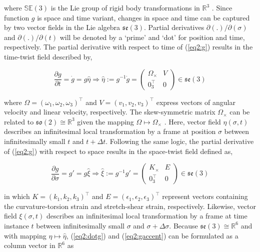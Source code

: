 where $\mathbb{SE}(3)$ is the Lie group of rigid body transformations in $\mathbb{R}^3$ \cite{Sola2018}. Since function $g$ is space and time variant, changes in space and time can be captured by two vector fields in the Lie algebra $\mathfrak{se}(3)$. Partial derivatives $\partial (.)/\partial(\sigma)$ and $\partial (.)/\partial(t)$ will be denoted by a `prime' and `dot' for position and time, respectively. The partial derivative with respect to time of (\ref{eq2:g}) results in the time-twist field described by,


\begin{equation}
    \frac{\partial g}{\partial t} = \dot{g} = g\hat{\eta} \Longrightarrow \hat{\eta} := g^{-1}\dot{g} = \begin{pmatrix} \Omega_\times & V \\ 0_3^\top & 0 \end{pmatrix} \in  \mathfrak{se}(3)
    \label{eq2:dotg}
\end{equation}

where $\Omega = (\omega_1,\omega_2,\omega_3)^\top$ and $V = (v_1,v_2,v_3)^\top$ express vectors of angular velocity and linear velocity, respectively. The skew-symmetric matrix $\Omega_\times$ can be related to $\mathfrak{so}(2) \cong \mathbb{R}^3$ given the mapping $\Omega \mapsto \Omega_\times$ \cite{Sola2018}. Here, vector field $\eta(\sigma,t)$ describes an infinitesimal local transformation by a frame at position $\sigma$ between infinitesimally small $t$ and $t+\Delta t$. Following the same logic, the partial derivative of (\ref{eq2:g}) with respect to space results in the space-twist field defined as,


\begin{equation}
   \frac{\partial g}{\partial \sigma} =  g' = g\hat{\xi} \Longrightarrow \hat{\xi} := g^{-1}g' = \begin{pmatrix} K_\times & E \\ 0_3^\top & 0 \end{pmatrix} \in  \mathfrak{se}(3)
    \label{eq2:gaccent}
\end{equation}

in which $K = (k_1,k_2,k_3)^\top$ and $E = (\epsilon_1,\epsilon_2,\epsilon_3)^\top$ represent vectors containing the curvature-torsion strain and stretch-shear strain, respectively. Likewise, vector field $\xi(\sigma,t)$ describes an infinitesimal local transformation by a frame at time instance $t$ between infinitesimally small $\sigma$ and $\sigma+\Delta \sigma$. Because $\mathfrak{se}(3) \cong \mathbb{R}^6$ and with mapping $\eta \mapsto \hat{\eta}$, (\ref{eq2:dotg}) and (\ref{eq2:gaccent}) can be formulated as a column vector in $\mathbb{R}^6$ as


